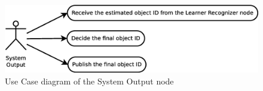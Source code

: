 	\begin{figure}[H]
		\centering
			\includegraphics[scale=0.4]{img/diagrams/uc_system_output.eps}
			\caption[Use case diagram System Output node]{Use Case diagram of the System Output node}
		
	\end{figure}